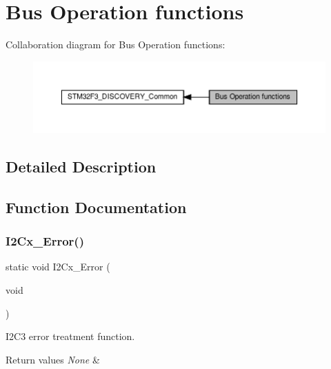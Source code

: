 \hypertarget{group__STM32F3__DISCOVERY__BUS}{}\section{Bus Operation functions}
\label{group__STM32F3__DISCOVERY__BUS}
Collaboration diagram for Bus Operation functions\+:\nopagebreak
\begin{figure}[H]
\begin{center}
\leavevmode
\includegraphics[width=350pt]{group__STM32F3__DISCOVERY__BUS}
\end{center}
\end{figure}


\subsection{Detailed Description}


\subsection{Function Documentation}
\mbox{\label{group__STM32F3__DISCOVERY__BUS_ga8361271ff9fae68927a67c607e431eab}} 
\subsubsection{\texorpdfstring{I2\+Cx\+\_\+\+Error()}{I2Cx\_Error()}}
{\footnotesize\ttfamily static void I2\+Cx\+\_\+\+Error (\begin{DoxyParamCaption}\item[{void}]{ }\end{DoxyParamCaption})\hspace{0.3cm}{\ttfamily [static]}}



I2\+C3 error treatment function. 


\begin{DoxyRetVals}{Return values}
{\em None} & \\
\hline
\end{DoxyRetVals}
\mbox{\label{group__STM32F3__DISCOVERY__BUS_ga73173918954bb7c4d175c84d0397ae5f}} 
